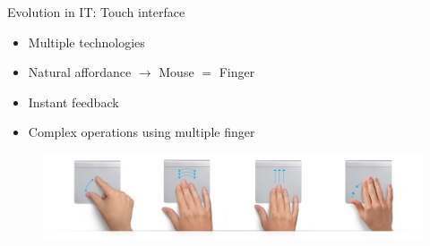 \documentclass{beamer}
\begin{document}
\begin{frame}{Evolution in IT: Touch interface}
\begin{itemize}
\item Multiple technologies
\item Natural affordance $\rightarrow$ Mouse $=$ Finger
\item Instant feedback
\item Complex operations using multiple finger
\end{itemize}
\begin{figure}[ht]
\includegraphics[scale=0.3]{multitouch_gestures_trackpad_2.jpg}
\end{figure}
\end{frame}
\end{document}
